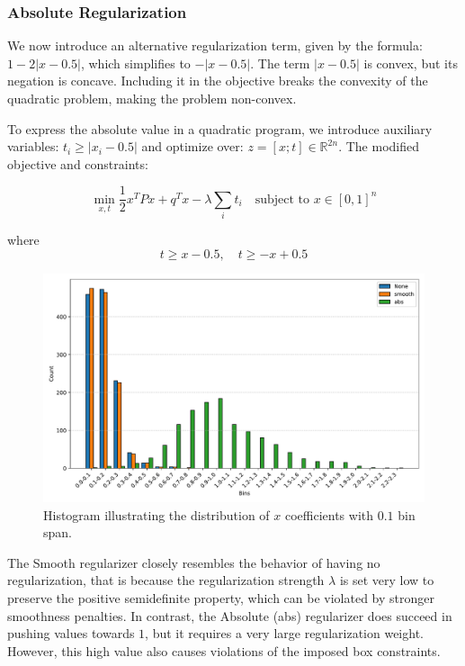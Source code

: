 \subsubsection{Absolute Regularization}

We now introduce an alternative regularization term, given by the formula: \(1-2\left|x-0.5\right|\), which simplifies to \(-\left|x-0.5\right|\). The term \(\left|x-0.5\right|\) is convex, but its negation is concave. Including it in the objective breaks the convexity of the quadratic problem, making the problem non-convex.

To express the absolute value in a quadratic program, we introduce auxiliary variables: \(t_i \geq \left|x_i - 0.5\right|\) and optimize over: \(z = \left[x;t\right] \in \mathbb{R}^{2n}\). The modified objective and constraints:

\begin{equation}
\min_{x, t} \frac{1}{2} x^TPx + q^Tx - \lambda \sum_i{t_i} \quad \text{subject to } x \in [0,1]^n
\end{equation}

where
\[t \geq x - 0.5, \quad t \geq -x + 0.5\]

\begin{figure}[H]
    \centering
    \includegraphics[width=\linewidth]{images/regularization/regularized_x_binned.pdf}
    \caption{Histogram illustrating the distribution of \(x\) coefficients with \(0.1\) bin span.}
    \label{fig:x_binned}
\end{figure}

The Smooth regularizer closely resembles the behavior of having no regularization, that is because the regularization strength \(\lambda\) is set very low to preserve the positive semidefinite property, which can be violated by stronger smoothness penalties. In contrast, the Absolute (abs) regularizer does succeed in pushing values towards \(1\), but it requires a very large regularization weight. However, this high value also causes violations of the imposed box constraints.

